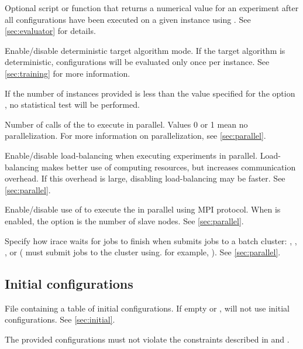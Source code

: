\begin{description}
Optional script or \aR function that returns a numerical value for an experiment after all configurations have been executed on a given instance using . See \autoref{sec:evaluator} for details.

  Enable/disable deterministic target algorithm mode. If the target algorithm is deterministic, configurations will be evaluated only once per instance. See \autoref{sec:training} for more information.
\begin{xwarningbox}
 If the number of instances provided is less than the value specified for the option , no statistical test will be performed.
\end{xwarningbox}

Number of calls of the  to execute in parallel. Values  0 or 1 mean no parallelization. For more information on parallelization, see \autoref{sec:parallel}.

  Enable/disable load-balancing when executing experiments in parallel. Load-balancing makes better use of computing resources, but increases communication overhead. If this overhead is large, disabling load-balancing may be faster. See \autoref{sec:parallel}.

  Enable/disable use of  to execute the  in parallel using MPI protocol. When  is enabled, the option  is the number of slave nodes. See \autoref{sec:parallel}.

  Specify how irace waits for jobs to finish when  submits jobs to a batch cluster: , , ,  or  ( must submit jobs to the cluster using. for example, ). See \autoref{sec:parallel}.

\end{description}

\subsection[Initial configurations]{Initial configurations}
\begin{description}
File containing a table of initial configurations. If empty or , \irace will not use initial configurations. See \autoref{sec:initial}.
\begin{xwarningbox}
The provided configurations must not violate the constraints described in  and .
\end{xwarningbox}

\end{description}

